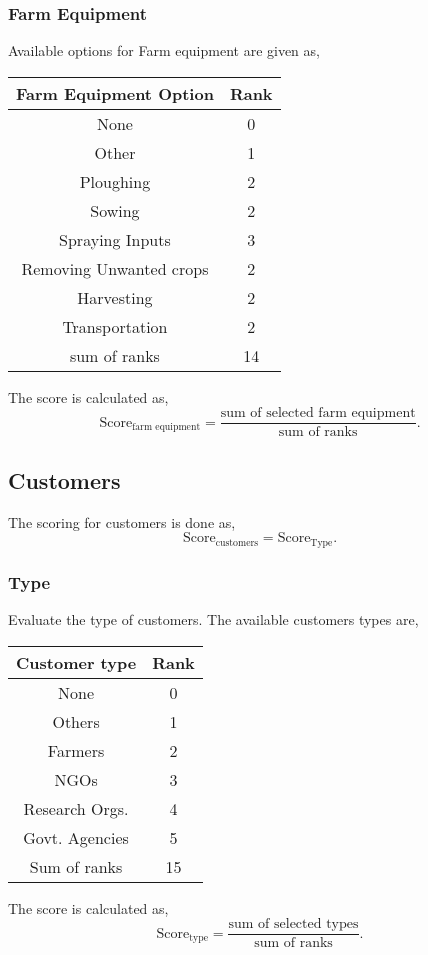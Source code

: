 \documentclass[oneside,twocolumn]{article}
\newcommand{\tsub}[2]{\text{#1}_{\text{#2}}}
\newenvironment{ttable}
               {\begin{center}
                   \begin{tabular}{c|c}
                     \hline
               }
               {\end{tabular}
                 \end{center}
               }
\begin{document}
\subsubsection{Farm Equipment}
Available options for Farm equipment are given as,
\begin{ttable}
  Farm Equipment Option & Rank \\ \hline
  None & 0 \\
  Other & 1 \\
  Ploughing & 2 \\
  Sowing & 2 \\
  Spraying Inputs & 3 \\
  Removing Unwanted crops & 2 \\
  Harvesting & 2 \\
  Transportation & 2 \\ \hline
  sum of ranks & 14 \\ \hline
\end{ttable}
The score is calculated as,
\[
\tsub{Score}{farm equipment} = \dfrac{\text{sum of selected farm equipment}}{\text{sum of ranks}}.
\]
\subsection{Customers}
The scoring for customers is done as,
\[
  \text{Score}_{\text{customers}} = \text{Score}_{\text{Type}}.
\]

\subsubsection{Type}
Evaluate the type of customers. The available customers types are,
\begin{center}
  \begin{tabular}{c|c}
    \hline
    Customer type & Rank \\ \hline
    None & 0 \\
    Others & 1 \\
    Farmers & 2 \\
    NGOs & 3 \\
    Research Orgs. & 4 \\
    Govt. Agencies & 5 \\ \hline
    Sum of ranks & 15 \\ \hline
  \end{tabular}
\end{center}
The score is calculated as,
\[
\text{Score}_{\text{type}} = \dfrac{\text{sum of selected types}}{\text{sum of ranks}}.
\]
\end{document}
